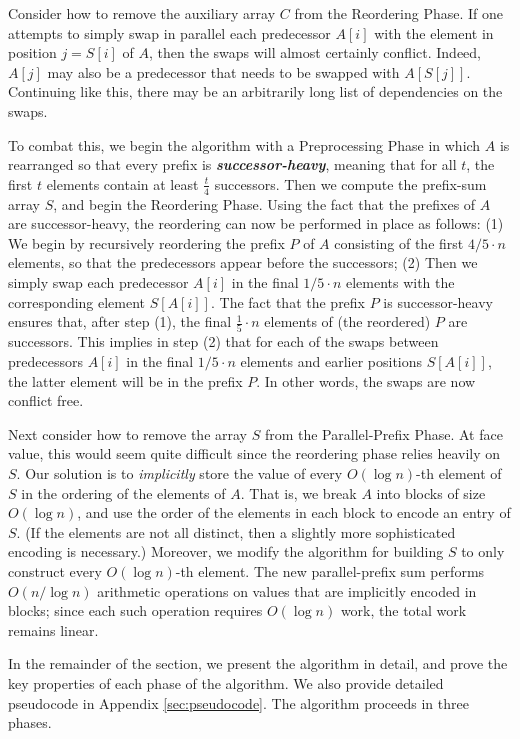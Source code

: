 \documentclass[11pt]{article}
\newcommand{\defn}[1]{{\textit{\textbf{\boldmath #1}}}}
\theoremstyle{remark}
\theoremstyle{remark}
\begin{document}
Consider how to remove the auxiliary array $C$ from the Reordering
Phase. If one attempts to simply swap in parallel each predecessor
$A[i]$ with the element in position $j = S[i]$ of $A$, then the swaps
will almost certainly conflict. Indeed, $A[j]$ may also be a
predecessor that needs to be swapped with $A[S[j]]$. Continuing like
this, there may be an arbitrarily long list of dependencies on the
swaps.

To combat this, we begin the algorithm with a Preprocessing Phase in
which $A$ is rearranged so that every prefix is
\defn{successor-heavy}, meaning that for all $t$, the first $t$
elements contain at least $\frac{t}{4}$ successors. Then we compute
the prefix-sum array $S$, and begin the Reordering Phase. Using the
fact that the prefixes of $A$ are successor-heavy, the reordering can
now be performed in place as follows: (1) We begin by recursively
reordering the prefix $P$ of $A$ consisting of the first $4/5 \cdot n$
elements, so that the predecessors appear before the successors; (2)
Then we simply swap each predecessor $A[i]$ in the final $1/5 \cdot n$
elements with the corresponding element $S[A[i]]$. The fact that the
prefix $P$ is successor-heavy ensures that, after step (1), the final 
$\frac{1}{5} \cdot n$ elements of (the reordered) $P$ are successors. 
This implies in step (2) that for each of the swaps between predecessors $A[i]$
in the final $1/5 \cdot n$ elements and earlier positions $S[A[i]]$, the latter
element will be in the prefix $P$. In other words, the swaps are now conflict
free.

Next consider how to remove the array $S$ from the Parallel-Prefix
Phase. At face value, this would seem quite difficult since the
reordering phase relies heavily on $S$. Our solution is to
\emph{implicitly} store the value of every $O(\log n)$-th element of
$S$ in the ordering of the elements of $A$. That is, we break $A$ into
blocks of size $O(\log n)$, and use the order of the elements in each
block to encode an entry of $S$. (If the elements are not all
  distinct, then a slightly more sophisticated encoding is necessary.)
Moreover, we modify the algorithm for building $S$ to only construct
every $O(\log n)$-th element. The new parallel-prefix sum performs
$O(n / \log n)$ arithmetic operations on values that are implicitly
encoded in blocks; since each such operation requires $O(\log n)$
work, the total work remains linear.

In the remainder of the section, we present the algorithm in detail,
and prove the key properties of each phase of the algorithm. We also
provide detailed pseudocode in Appendix \ref{sec:pseudocode}. The
algorithm proceeds in three phases.
\end{document}
